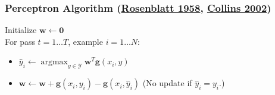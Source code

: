 \documentclass[ignorenonframetext,plain]{beamer}
\DeclareMathOperator*{\argmax}{argmax}
\renewcommand{\vec}{\mathbf}
\begin{document}
\begin{frame}\frametitle{Perceptron Algorithm 
(\href{http://www2.denizyuret.com/bibtex.php?fn=show&nselect=1&e1=986}{Rosenblatt 1958},
\href{http://aclweb.org/anthology//W/W02/W02-1001.pdf}{Collins 2002})} %
Initialize $\vec{w} \leftarrow \vec{0}$\\
For pass $t=1\dots T$, example $i=1\dots N$:\\
\begin{itemize}
\item $\hat{y}_i \leftarrow \argmax_{y\in\mathcal{Y}}
    \vec{w}^T\vec{g}(x_i, y)$
\item $\vec{w} \leftarrow \vec{w} 
+\vec{g}(x_i,y_i)
-\vec{g}(x_i,\hat{y}_i)$ 
\hspace{10mm}
\small (No update if $\hat{y}_i=y_i$.)
\end{itemize}
\end{frame}
\end{document}
